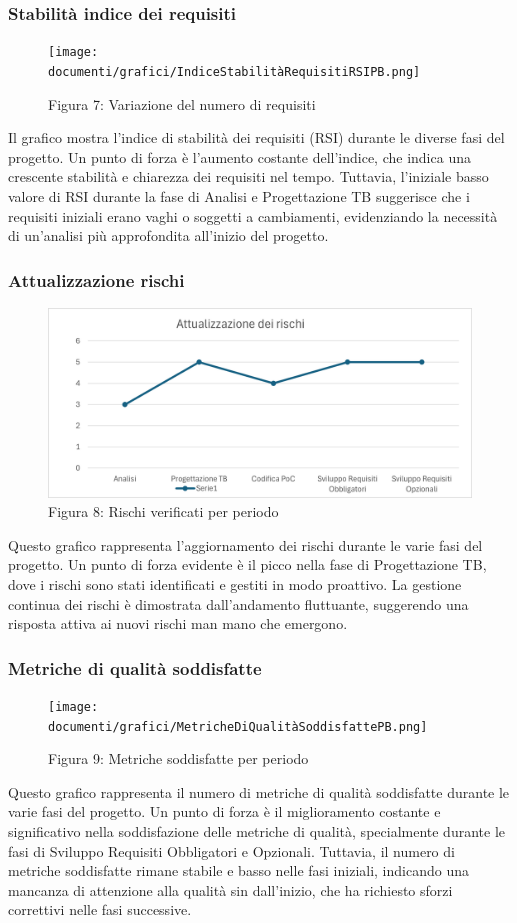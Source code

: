 \documentclass{article}
\begin{document}
\subsubsection{Stabilità indice dei requisiti}
\begin{figure}[H]
    \centering
    \texttt{[image: documenti/grafici/IndiceStabilitàRequisitiRSIPB.png]}
    \caption{Figura 7: Variazione del numero di requisiti}
    \end{figure}
     Il grafico mostra l'indice di stabilità dei requisiti (RSI) durante le diverse fasi del progetto. Un punto di forza è l'aumento costante dell'indice, che indica una crescente stabilità e chiarezza dei requisiti nel tempo. Tuttavia, l'iniziale basso valore di RSI durante la fase di Analisi e Progettazione TB suggerisce che i requisiti iniziali erano vaghi o soggetti a cambiamenti, evidenziando la necessità di un'analisi più approfondita all'inizio del progetto.
\subsubsection{Attualizzazione rischi}
\begin{figure}[H]
    \centering
    \includegraphics{documenti/grafici/AttualizzazioneDeiRischiPB.png}
    \caption{Figura 8: Rischi verificati per periodo}
    \end{figure}
    Questo grafico rappresenta l'aggiornamento dei rischi durante le varie fasi del progetto. Un punto di forza evidente è il picco nella fase di Progettazione TB, dove i rischi sono stati identificati e gestiti in modo proattivo. La gestione continua dei rischi è dimostrata dall'andamento fluttuante, suggerendo una risposta attiva ai nuovi rischi man mano che emergono.
\subsubsection{Metriche di qualità soddisfatte}
\begin{figure}[H]
    \centering
    \texttt{[image: documenti/grafici/MetricheDiQualitàSoddisfattePB.png]}
    \caption{Figura 9: Metriche soddisfatte per periodo}
    \end{figure}
    Questo grafico rappresenta il numero di metriche di qualità soddisfatte durante le varie fasi del progetto. Un punto di forza è il miglioramento costante e significativo nella soddisfazione delle metriche di qualità, specialmente durante le fasi di Sviluppo Requisiti Obbligatori e Opzionali. Tuttavia, il numero di metriche soddisfatte rimane stabile e basso nelle fasi iniziali, indicando una mancanza di attenzione alla qualità sin dall'inizio, che ha richiesto sforzi correttivi nelle fasi successive.
\end{document}
